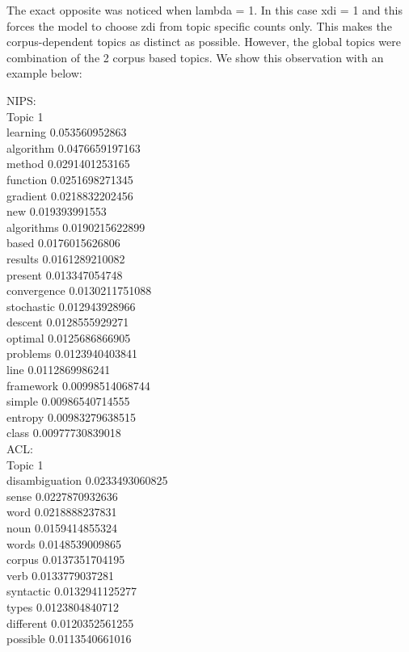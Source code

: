 \documentclass{article}
\begin{document}
{The exact opposite was noticed when lambda = 1. In this case xdi = 1 and this forces the model to choose zdi from topic specific counts only. This makes the corpus-dependent topics as distinct as possible. However, the global topics were combination of the 2 corpus based topics. We show this observation with an example below:

NIPS:\\
Topic 1\\
learning 0.053560952863\\
algorithm 0.0476659197163\\
method 0.0291401253165\\
function 0.0251698271345\\
gradient 0.0218832202456\\
new 0.019393991553\\
algorithms 0.0190215622899\\
based 0.0176015626806\\
results 0.0161289210082\\
present 0.013347054748\\
convergence 0.0130211751088\\
stochastic 0.012943928966\\
descent 0.0128555929271\\
optimal 0.0125686866905\\
problems 0.0123940403841\\
line 0.0112869986241\\
framework 0.00998514068744\\
simple 0.00986540714555\\
entropy 0.00983279638515\\
class 0.00977730839018\\
ACL:\\
Topic 1\\
disambiguation 0.0233493060825\\
sense 0.0227870932636\\
word 0.0218888237831\\
noun 0.0159414855324\\
words 0.0148539009865\\
corpus 0.0137351704195\\
verb 0.0133779037281\\
syntactic 0.0132941125277\\
types 0.0123804840712\\
different 0.0120352561255\\
possible 0.0113540661016\\
}
\end{document}
